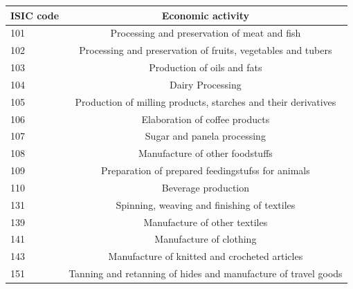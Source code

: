 \documentclass[12pt,a4paper]{article}
\begin{document}
{\begin{longtable}{@{}lc@{}}
	\toprule
	\multicolumn{1}{c}{\textbf{ISIC code}} & \textbf{Economic   activity}                                             \\ \midrule
	101                                            & Processing   and preservation of meat and fish                           \\
	102                                            & Processing and preservation of   fruits, vegetables and tubers           \\
	103                                            & Production of oils and fats                                              \\
	104                                            & Dairy Processing                                                         \\
	105                                            & Production of milling products,   starches and their derivatives         \\
	106                                            & Elaboration of coffee products                                           \\
	107                                            & Sugar and panela processing                                              \\
	108                                            & Manufacture of other foodstuffs                                          \\
	109                                            & Preparation of prepared   feedingstufss for animals                      \\
	110                                            & Beverage production                                                      \\
	131                                            & Spinning, weaving and finishing   of textiles                            \\
	139                                            & Manufacture of other textiles                                            \\
	141                                            & Manufacture of clothing                                                  \\
	143                                            & Manufacture of knitted and   crocheted articles                          \\
	151                                            & Tanning and retanning of hides   and manufacture of travel goods         \\

\end{longtable}}
\end{document}
